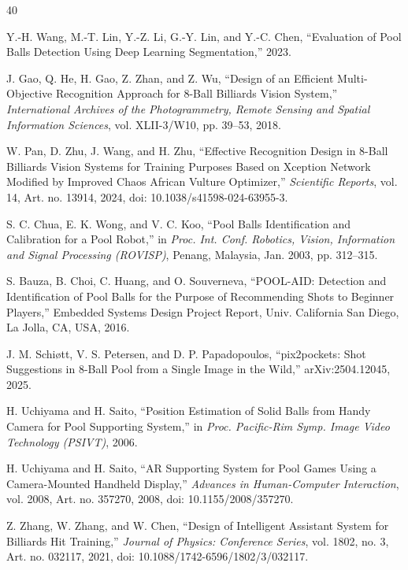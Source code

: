 \begin{thebibliography}{40}

 Y.-H. Wang, M.-T. Lin, Y.-Z. Li, G.-Y. Lin, and Y.-C. Chen, ``Evaluation of Pool Balls Detection Using Deep Learning Segmentation,'' 2023.

 J. Gao, Q. He, H. Gao, Z. Zhan, and Z. Wu, ``Design of an Efficient Multi-Objective Recognition Approach for 8-Ball Billiards Vision System,'' \textit{International Archives of the Photogrammetry, Remote Sensing and Spatial Information Sciences}, vol. XLII-3/W10, pp. 39--53, 2018.

 W. Pan, D. Zhu, J. Wang, and H. Zhu, ``Effective Recognition Design in 8-Ball Billiards Vision Systems for Training Purposes Based on Xception Network Modified by Improved Chaos African Vulture Optimizer,'' \textit{Scientific Reports}, vol. 14, Art. no. 13914, 2024, doi: 10.1038/s41598-024-63955-3.

 S. C. Chua, E. K. Wong, and V. C. Koo, ``Pool Balls Identification and Calibration for a Pool Robot,'' in \textit{Proc. Int. Conf. Robotics, Vision, Information and Signal Processing (ROVISP)}, Penang, Malaysia, Jan. 2003, pp. 312--315.

 S. Bauza, B. Choi, C. Huang, and O. Souverneva, ``POOL-AID: Detection and Identification of Pool Balls for the Purpose of Recommending Shots to Beginner Players,'' Embedded Systems Design Project Report, Univ. California San Diego, La Jolla, CA, USA, 2016.

 J. M. Schi{\o}tt, V. S. Petersen, and D. P. Papadopoulos, ``pix2pockets: Shot Suggestions in 8-Ball Pool from a Single Image in the Wild,'' arXiv:2504.12045, 2025.

 H. Uchiyama and H. Saito, ``Position Estimation of Solid Balls from Handy Camera for Pool Supporting System,'' in \textit{Proc. Pacific-Rim Symp. Image Video Technology (PSIVT)}, 2006.

 H. Uchiyama and H. Saito, ``AR Supporting System for Pool Games Using a Camera-Mounted Handheld Display,'' \textit{Advances in Human-Computer Interaction}, vol. 2008, Art. no. 357270, 2008, doi: 10.1155/2008/357270.

 Z. Zhang, W. Zhang, and W. Chen, ``Design of Intelligent Assistant System for Billiards Hit Training,'' \textit{Journal of Physics: Conference Series}, vol. 1802, no. 3, Art. no. 032117, 2021, doi: 10.1088/1742-6596/1802/3/032117.


\end{thebibliography}
